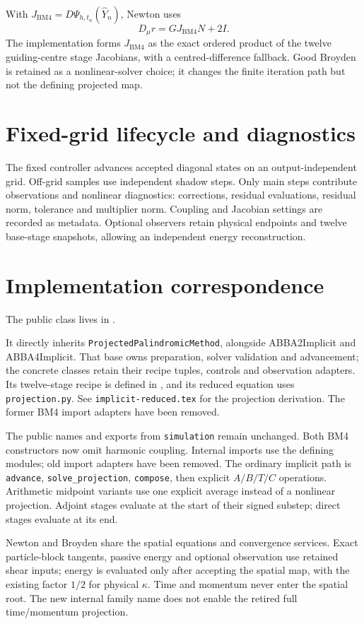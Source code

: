 \documentclass[11pt,a4paper]{article}
\begin{document}
With $J_{\mathrm{BM4}}=D\Psi_{h,t_n}(\widehat Y_n)$, Newton uses
\[
D_\mu r=GJ_{\mathrm{BM4}}N+2I.
\]
The implementation forms $J_{\mathrm{BM4}}$ as the exact ordered product of
the twelve guiding-centre stage Jacobians, with a centred-difference fallback.
Good Broyden is retained as a nonlinear-solver choice; it changes the finite
iteration path but not the defining projected map.

\section{Fixed-grid lifecycle and diagnostics}

The fixed controller advances accepted diagonal states on an output-independent
grid. Off-grid samples use independent shadow steps. Only main steps contribute
observations and nonlinear diagnostics: corrections, residual evaluations,
residual norm, tolerance and multiplier norm. Coupling and Jacobian settings
are recorded as metadata. Optional observers retain physical endpoints and
twelve base-stage snapshots, allowing an independent energy reconstruction.

\section{Implementation correspondence}
The public class lives in .

It directly inherits
\texttt{ProjectedPalindromicMethod}, alongside ABBA2Implicit and ABBA4Implicit.
That base owns preparation, solver validation and advancement; the concrete
classes retain their recipe tuples, controls and observation adapters.
Its twelve-stage recipe is defined in , and its
reduced equation uses \texttt{projection.py}. See \texttt{implicit-reduced.tex}
for the projection derivation. The former BM4 import adapters have been removed.

The public names and exports from \texttt{simulation} remain unchanged.
Both BM4 constructors now omit harmonic coupling. Internal imports use the defining modules; old import
adapters have been removed. The ordinary implicit path is \texttt{advance}, \texttt{solve\_projection},
\texttt{compose}, then explicit $A/B/T/C$ operations.
Arithmetic midpoint variants use one explicit average instead of a nonlinear
projection. Adjoint stages evaluate at the start of their signed substep;
direct stages evaluate at its end.

Newton and Broyden share the spatial equations and convergence services.
Exact particle-block tangents, passive energy and optional observation use
retained shear inputs; energy is evaluated only after accepting the spatial
map, with the existing factor $1/2$ for physical $\kappa$. Time and momentum
never enter the spatial root. The new internal family name does not enable
the retired full time/momentum projection.
\end{document}
